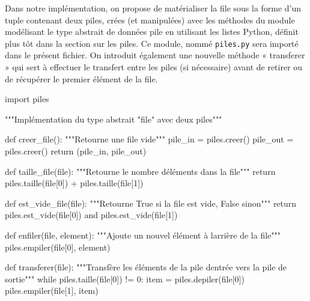 \documentclass[
  a4paper,
  DIV=11,
  numbers=noendperiod]{scrartcl}
\newenvironment{Shaded}{\begin{snugshade}}{\end{snugshade}}
\newcommand{\BuiltInTok}[1]{\textcolor[rgb]{0.00,0.23,0.31}{#1}}
\newcommand{\CommentTok}[1]{\textcolor[rgb]{0.37,0.37,0.37}{#1}}
\newcommand{\ControlFlowTok}[1]{\textcolor[rgb]{0.00,0.23,0.31}{#1}}
\newcommand{\DecValTok}[1]{\textcolor[rgb]{0.68,0.00,0.00}{#1}}
\newcommand{\ImportTok}[1]{\textcolor[rgb]{0.00,0.46,0.62}{#1}}
\newcommand{\KeywordTok}[1]{\textcolor[rgb]{0.00,0.23,0.31}{#1}}
\newcommand{\NormalTok}[1]{\textcolor[rgb]{0.00,0.23,0.31}{#1}}
\newcommand{\OperatorTok}[1]{\textcolor[rgb]{0.37,0.37,0.37}{#1}}
\begin{document}
Dans notre implémentation, on propose de matérialiser la file sous la
forme d'un tuple contenant deux piles, crées (et manipulées) avec les
méthodes du module modélisant le type abstrait de données pile en
utilisant les listes Python, définit plus tôt dans la section sur les
piles. Ce module, nommé \texttt{piles.py} sera importé dans le présent
fichier. On introduit également une nouvelle méthode « transferer » qui
sert à effectuer le transfert entre les piles (si nécessaire) avant de
retirer ou de récupérer le premier élément de la file.

\begin{Shaded}
\begin{Highlighting}[]
\ImportTok{import}\NormalTok{ piles}

\CommentTok{"""Implémentation du type abstrait "file" avec deux piles"""}


\KeywordTok{def}\NormalTok{ creer\_file():}
    \CommentTok{"""Retourne une file vide"""}
\NormalTok{    pile\_in }\OperatorTok{=}\NormalTok{ piles.creer()}
\NormalTok{    pile\_out }\OperatorTok{=}\NormalTok{ piles.creer()}
    \ControlFlowTok{return}\NormalTok{ (pile\_in, pile\_out)}


\KeywordTok{def}\NormalTok{ taille\_file(}\BuiltInTok{file}\NormalTok{):}
    \CommentTok{"""Retourne le nombre d\textquotesingle{}éléments dans la file"""}
    \ControlFlowTok{return}\NormalTok{ piles.taille(}\BuiltInTok{file}\NormalTok{[}\DecValTok{0}\NormalTok{]) }\OperatorTok{+}\NormalTok{ piles.taille(}\BuiltInTok{file}\NormalTok{[}\DecValTok{1}\NormalTok{])}


\KeywordTok{def}\NormalTok{ est\_vide\_file(}\BuiltInTok{file}\NormalTok{):}
    \CommentTok{"""Retourne True si la file est vide, False sinon"""}
    \ControlFlowTok{return}\NormalTok{ piles.est\_vide(}\BuiltInTok{file}\NormalTok{[}\DecValTok{0}\NormalTok{]) }\KeywordTok{and}\NormalTok{ piles.est\_vide(}\BuiltInTok{file}\NormalTok{[}\DecValTok{1}\NormalTok{])}


\KeywordTok{def}\NormalTok{ enfiler(}\BuiltInTok{file}\NormalTok{, element):}
    \CommentTok{"""Ajoute un nouvel élément à l\textquotesingle{}arrière de la file"""}
\NormalTok{    piles.empiler(}\BuiltInTok{file}\NormalTok{[}\DecValTok{0}\NormalTok{], element)}


\KeywordTok{def}\NormalTok{ transferer(}\BuiltInTok{file}\NormalTok{):}
    \CommentTok{"""Transfère les éléments de la pile d\textquotesingle{}entrée vers la pile de sortie"""}
    \ControlFlowTok{while}\NormalTok{ piles.taille(}\BuiltInTok{file}\NormalTok{[}\DecValTok{0}\NormalTok{]) }\OperatorTok{!=} \DecValTok{0}\NormalTok{:}
\NormalTok{        item }\OperatorTok{=}\NormalTok{ piles.depiler(}\BuiltInTok{file}\NormalTok{[}\DecValTok{0}\NormalTok{])}
\NormalTok{        piles.empiler(}\BuiltInTok{file}\NormalTok{[}\DecValTok{1}\NormalTok{], item)}



\end{Highlighting}
\end{Shaded}
\end{document}
